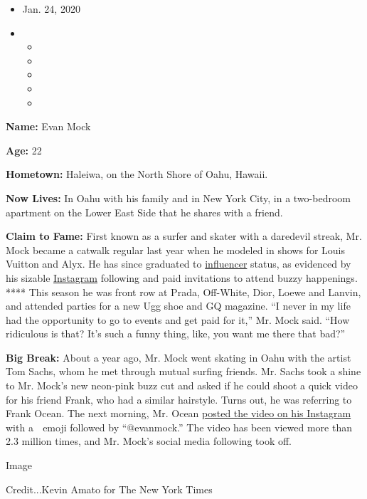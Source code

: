 \begin{itemize}
\item
  Jan. 24, 2020
\item
  \begin{itemize}
  \item
  \item
  \item
  \item
  \item
  \end{itemize}
\end{itemize}

\textbf{Name:} Evan Mock

\textbf{Age:} 22

\textbf{Hometown:} Haleiwa, on the North Shore of Oahu, Hawaii.

\textbf{Now Lives:} In Oahu with his family and in New York City, in a
two-bedroom apartment on the Lower East Side that he shares with a
friend.

\textbf{Claim to Fame:} First known as a surfer and skater with a
daredevil streak, Mr. Mock became a catwalk regular last year when he
modeled in shows for Louis Vuitton and Alyx. He has since graduated to
\href{https://www.nytimes.com/2019/07/16/technology/vidcon-social-media-influencers.html}{influencer}
status, as evidenced by his sizable
\href{https://www.instagram.com/evanmock}{Instagram} following and paid
invitations to attend buzzy happenings. **** This season he was front
row at Prada, Off-White, Dior, Loewe and Lanvin, and attended parties
for a new Ugg shoe and GQ magazine. ``I never in my life had the
opportunity to go to events and get paid for it,'' Mr. Mock said. ``How
ridiculous is that? It's such a funny thing, like, you want me there
that bad?''

\textbf{Big Break:} About a year ago, Mr. Mock went skating in Oahu with
the artist Tom Sachs, whom he met through mutual surfing friends. Mr.
Sachs took a shine to Mr. Mock's new neon-pink buzz cut and asked if he
could shoot a quick video for his friend Frank, who had a similar
hairstyle. Turns out, he was referring to Frank Ocean. The next morning,
Mr. Ocean \href{https://www.instagram.com/p/BsNW-ZSFrbK/}{posted the
video on his Instagram} with a 👋 emoji followed by ``@evanmock.'' The
video has been viewed more than 2.3 million times, and Mr. Mock's social
media following took off.

Image

Credit...Kevin Amato for The New York Times

